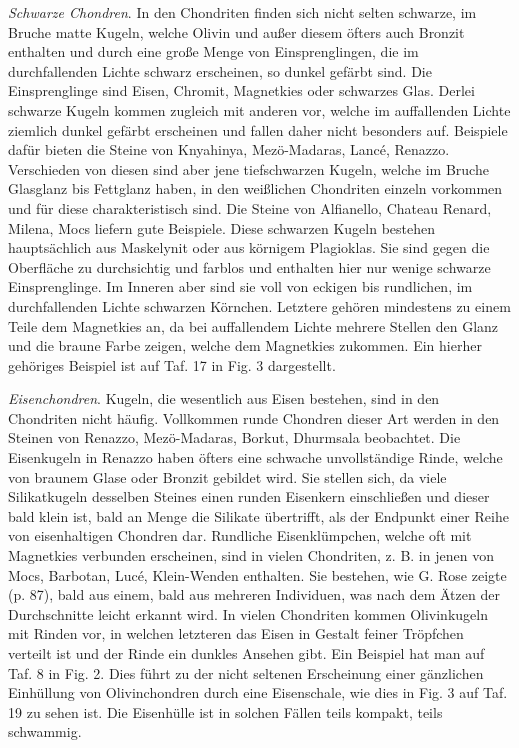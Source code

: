 \documentclass[a4paper, 11pt, oneside, polutonikogreek, german]{article}
\begin{document}
\emph{Schwarze Chondren}. In den Chondriten finden sich nicht selten schwarze, im Bruche matte Kugeln, welche Olivin und außer diesem öfters auch Bronzit enthalten und durch eine große Menge von Einsprenglingen, die im durchfallenden Lichte schwarz erscheinen, so dunkel gefärbt sind. Die Einsprenglinge sind Eisen, Chromit, Magnetkies oder schwarzes Glas. Derlei schwarze Kugeln kommen zugleich mit anderen vor, welche im auffallenden Lichte ziemlich dunkel gefärbt erscheinen und fallen daher nicht besonders auf. Beispiele dafür bieten die Steine von Knyahinya, Mezö-Madaras, Lancé, Renazzo. Verschieden von diesen sind aber jene tiefschwarzen Kugeln, welche im Bruche Glasglanz bis Fettglanz haben, in den weißlichen Chondriten einzeln vorkommen und für diese charakteristisch sind. Die Steine von Alfianello, Chateau Renard, Milena, Mocs liefern gute Beispiele. Diese schwarzen Kugeln bestehen hauptsächlich aus Maskelynit oder aus körnigem Plagioklas. Sie sind gegen die Oberfläche zu durchsichtig und farblos und enthalten hier nur wenige schwarze Einsprenglinge. Im Inneren aber sind sie voll von eckigen bis rundlichen, im durchfallenden Lichte schwarzen Körnchen. Letztere gehören mindestens zu einem Teile dem Magnetkies an, da bei auffallendem Lichte mehrere Stellen den Glanz und die braune Farbe zeigen, welche dem Magnetkies zukommen. Ein hierher gehöriges Beispiel ist auf Taf. 17 in Fig. 3 dargestellt.

\emph{Eisenchondren}. Kugeln, die wesentlich aus Eisen bestehen, sind in den Chondriten nicht häufig. Vollkommen runde Chondren dieser Art werden in den Steinen von Renazzo, Mezö-Madaras, Borkut, Dhurmsala beobachtet. Die Eisenkugeln in Renazzo haben öfters eine schwache unvollständige Rinde, welche von braunem Glase oder Bronzit gebildet wird. Sie stellen sich, da viele Silikatkugeln desselben Steines einen runden Eisenkern einschließen und dieser bald klein ist, bald an Menge die Silikate übertrifft, als der Endpunkt einer Reihe von eisenhaltigen Chondren dar. Rundliche Eisenklümpchen, welche oft mit Magnetkies verbunden erscheinen, sind in vielen Chondriten, z. B. in jenen von Mocs, Barbotan, Lucé, Klein-Wenden enthalten. Sie bestehen, wie G. Rose zeigte (p. 87), bald aus einem, bald aus mehreren Individuen, was nach dem Ätzen der Durchschnitte leicht erkannt wird. In vielen Chondriten kommen Olivinkugeln mit Rinden vor, in welchen letzteren das Eisen in Gestalt feiner Tröpfchen verteilt ist und der Rinde ein dunkles Ansehen gibt. Ein Beispiel hat man auf Taf. 8 in Fig. 2. Dies führt zu der nicht seltenen Erscheinung einer gänzlichen Einhüllung von Olivinchondren durch eine Eisenschale, wie dies in Fig. 3 auf Taf. 19 zu sehen ist. Die Eisenhülle ist in solchen Fällen teils kompakt, teils schwammig.
\end{document}
